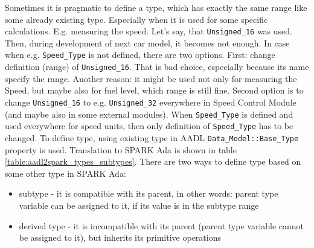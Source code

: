 Sometimes it is pragmatic to define a type, which has exactly the same range like some already existing type. Especially when it is used for some specific calculations. E.g. measuring the speed. Let's say, that \lstinline{Unsigned_16} was used. Then, during development of next car model, it becomes not enough. In case when e.g. \lstinline{Speed_Type} is not defined, there are two options. First: change definition (range) of \lstinline{Unsigned_16}. That is bad choice, especially because its name specify the range. Another reason: it might be used not only for measuring the Speed, but maybe also for fuel level, which range is still fine. Second option is to change \lstinline{Unsigned_16} to e.g. \lstinline{Unsigned_32} everywhere in Speed Control Module (and maybe also in some external modules). When \lstinline{Speed_Type} is defined and used everywhere for speed units, then only definition of \lstinline{Speed_Type} has to be changed. To define type, using existing type in AADL \lstinline{Data_Model::Base_Type} property is used. Translation to SPARK Ada is shown in table \ref{table:aadl2spark_types_subtypes}. There are two ways to define type based on some other type in SPARK Ada:

\begin{itemize}
	\item subtype - it is compatible with its parent, in other words: parent type variable can be assigned to it, if its value is in the subtype range
	\item derived type - it is incompatible with its parent (parent type variable cannot be assigned to it), but inherits its primitive operations
\end{itemize}

